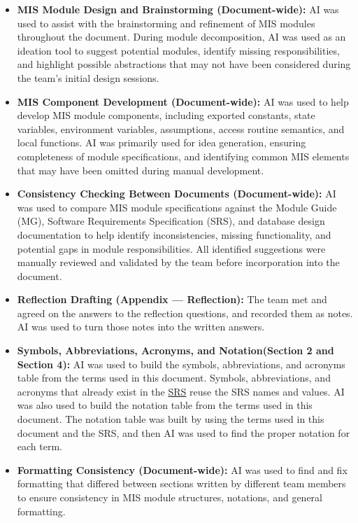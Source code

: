 \documentclass[12pt, titlepage]{article}
\begin{document}
\begin{itemize}
    \item \textbf{MIS Module Design and Brainstorming (Document-wide):} AI was used 
    to assist with the brainstorming and refinement of MIS modules throughout the 
    document. During module decomposition, AI was used as an ideation tool to suggest 
    potential modules, identify missing responsibilities, and highlight possible 
    abstractions that may not have been considered during the team's initial design 
    sessions.
    \item \textbf{MIS Component Development (Document-wide):} AI was used to help 
    develop MIS module components, including exported constants, state variables, 
    environment variables, assumptions, access routine semantics, and local functions. 
    AI was primarily used for idea generation, ensuring completeness of module specifications, 
    and identifying common MIS elements that may have been omitted during manual development. 
    \item \textbf{Consistency Checking Between Documents (Document-wide):} AI was used to 
    compare MIS module specifications against the Module Guide (MG), Software Requirements 
    Specification (SRS), and database design documentation to help identify inconsistencies, 
    missing functionality, and potential gaps in module responsibilities. All identified 
    suggestions were manually reviewed and validated by the team before incorporation into the document.
    \item \textbf{Reflection Drafting (Appendix --- Reflection):} The team met
    and agreed on the answers to the reflection questions, and recorded them as
    notes. AI was used to turn those notes into the written answers.
    \item \textbf{Symbols, Abbreviations, Acronyms, and Notation(Section 2 and Section 4):} AI was used to build the
    symbols, abbreviations, and acronyms table from the terms used in this
    document. Symbols, abbreviations, and acronyms that already exist in the \href{https://github.com/arjunkarthik123/fitness-finance-application/blob/main/pdfs/SRS-Volere/SRS.pdf}{SRS} reuse
    the SRS names and values. AI was also used to build the notation table from the terms used in this document. The notation table was built by using the terms used in this document and the SRS, and then AI was used to find the proper notation for each term.
    \item \textbf{Formatting Consistency (Document-wide):} AI was used to
    find and fix formatting that differed between sections written by
    different team members to ensure consistency in MIS module structures, notations, and general formatting.
\end{itemize}
\end{document}
